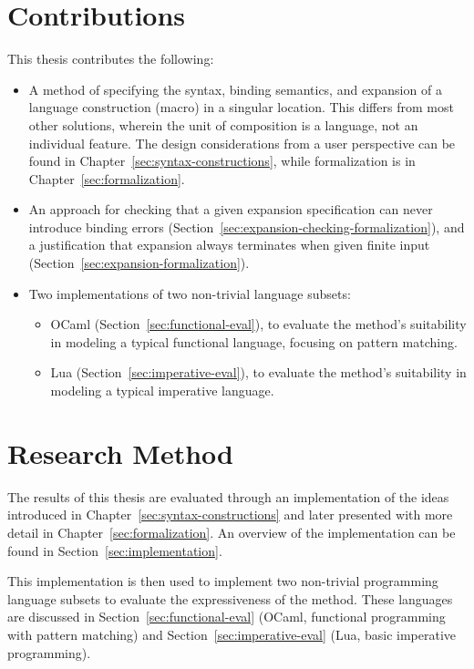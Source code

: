 \documentclass{kththesis}
\begin{document}
\section{Contributions} \label{sec:contributions}

This thesis contributes the following:

\begin{itemize}
  \item A method of specifying the syntax, binding semantics, and expansion of a language construction (macro) in a singular location. This differs from most other solutions, wherein the unit of composition is a language, not an individual feature. The design considerations from a user perspective can be found in Chapter~\ref{sec:syntax-constructions}, while formalization is in Chapter~\ref{sec:formalization}.
  \item An approach for checking that a given expansion specification can never introduce binding errors (Section~\ref{sec:expansion-checking-formalization}), and a justification that expansion always terminates when given finite input (Section~\ref{sec:expansion-formalization}).
  \item Two implementations of two non-trivial language subsets:
  \begin{itemize}
    \item OCaml (Section~\ref{sec:functional-eval}), to evaluate the method's suitability in modeling a typical functional language, focusing on pattern matching.
    \item Lua (Section~\ref{sec:imperative-eval}), to evaluate the method's suitability in modeling a typical imperative language.
  \end{itemize}
\end{itemize}

\section{Research Method}

The results of this thesis are evaluated through an implementation of the ideas introduced in Chapter~\ref{sec:syntax-constructions} and later presented with more detail in Chapter~\ref{sec:formalization}. An overview of the implementation can be found in Section~\ref{sec:implementation}.

This implementation is then used to implement two non-trivial programming language subsets to evaluate the expressiveness of the method. These languages are discussed in Section~\ref{sec:functional-eval} (OCaml, functional programming with pattern matching) and Section~\ref{sec:imperative-eval} (Lua, basic imperative programming).
\end{document}
